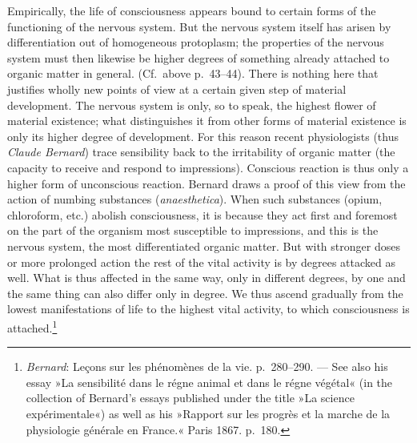 \documentclass[12pt,a4paper]{book}
\newcommand{\opage}[1]{\marginnote{\footnotesize\textit{[#1]}}}
\begin{document}
Empirically, the life of consciousness appears bound to certain forms of
the functioning of the nervous system. But the nervous system itself has
arisen by differentiation out of homogeneous protoplasm; the properties of
the nervous system must then likewise be higher degrees of something
already attached to organic matter in general. (Cf.\ above p.~43--44).
\opage{98}There is nothing here that justifies wholly new points of view
at a certain given step of material development. The nervous system is
only, so to speak, the highest flower of material existence; what
distinguishes it from other forms of material existence is only its
higher degree of development. For this reason recent physiologists (thus
\emph{Claude Bernard}) trace sensibility back to the irritability of
organic matter (the capacity to receive and respond to impressions).
Conscious reaction is thus only a higher form of unconscious reaction.
Bernard draws a proof of this view from the action of numbing substances
(\textit{anaesthetica}). When such substances (opium, chloroform, etc.)
abolish consciousness, it is because they act first and foremost on the
part of the organism most susceptible to impressions, and this is the
nervous system, the most differentiated organic matter. But with stronger
doses or more prolonged action the rest of the vital activity is by
degrees attacked as well. What is thus affected in the same way, only in
different degrees, by one and the same thing can also differ only in
degree. We thus ascend gradually from the lowest manifestations of life
to the highest vital activity, to which consciousness is
attached.\footnote{\emph{Bernard}: Leçons sur les phénomènes de la vie.
p.~280--290. --- See also his essay »La sensibilité dans le régne animal
et dans le régne végétal« (in the collection of Bernard's essays published
under the title »La science expérimentale«) as well as his »Rapport sur
les progrès et la marche de la physiologie générale en France.« Paris
1867. p.~180.}
\end{document}
